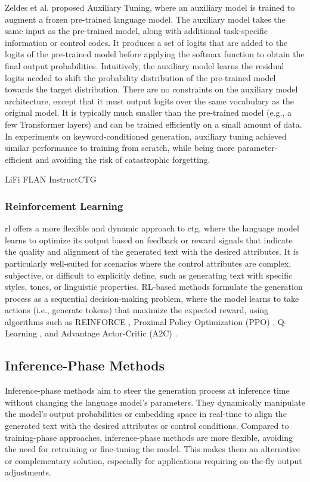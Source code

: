 Zeldes et al. \cite{zeldes2020auxiliarytuning} proposed Auxiliary Tuning, where an auxiliary model is trained to augment a frozen pre-trained language model.
The auxiliary model takes the same input as the pre-trained model, along with additional task-specific information or control codes. It produces a set of logits that are added to the logits of the pre-trained model before applying the softmax function to obtain the final output probabilities.
Intuitively, the auxiliary model learns the residual logits needed to shift the probability distribution of the pre-trained model towards the target distribution.
There are no constraints on the auxiliary model architecture, except that it must output logits over the same vocabulary as the original model.
It is typically much smaller than the pre-trained model (e.g., a few Transformer layers) and can be trained efficiently on a small amount of data.
In experiments on keyword-conditioned generation, auxiliary tuning achieved similar performance to training from scratch, while being more parameter-efficient and avoiding the risk of catastrophic forgetting.


LiFi
FLAN
InstructCTG

\subsubsection{Reinforcement Learning}
\gls{rl} offers a more flexible and dynamic approach to \gls{ctg}, where the language model learns to optimize its output based on feedback or reward signals that indicate the quality and alignment of the generated text with the desired attributes. 
It is particularly well-suited for scenarios where the control attributes are complex, subjective, or difficult to explicitly define, such as generating text with specific styles, tones, or linguistic properties. 
RL-based methods formulate the generation process as a sequential decision-making problem, where the model learns to take actions (i.e., generate tokens) that maximize the expected reward, using algorithms such as REINFORCE \cite{williams1992reinforce}, Proximal Policy Optimization (PPO) \cite{schulman2017ppo}, Q-Learning \cite{watkins1992qlearning}, and Advantage Actor-Critic (A2C) \cite{mnih2016a3c}.

\subsection{Inference-Phase Methods}
Inference-phase methods aim to steer the generation process at inference time without changing the language model's parameters.
They dynamically manipulate the model's output probabilities or embedding space in real-time to align the generated text with the desired attributes or control conditions.
Compared to training-phase approaches, inference-phase methods are more flexible, avoiding the need for retraining or fine-tuning the model.
This makes them an alternative or complementary solution, especially for applications requiring on-the-fly output adjustments.

